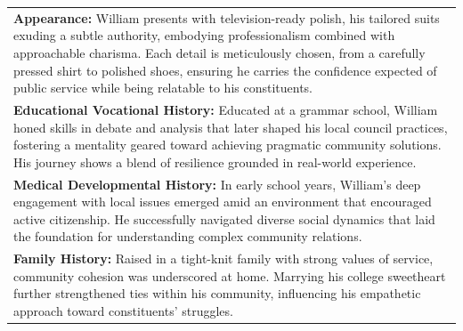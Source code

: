 \documentclass[11pt]{article}
\begin{document}
\begin{table}[ht]
\begin{tabularx}{\textwidth}{X}
\textbf{Appearance:} William presents with television-ready polish, his tailored suits exuding a subtle authority, embodying professionalism combined with approachable charisma. Each detail is meticulously chosen, from a carefully pressed shirt to polished shoes, ensuring he carries the confidence expected of public service while being relatable to his constituents. \\[4pt]

\textbf{Educational Vocational History:} Educated at a grammar school, William honed skills in debate and analysis that later shaped his local council practices, fostering a mentality geared toward achieving pragmatic community solutions. His journey shows a blend of resilience grounded in real-world experience. \\[4pt]

\textbf{Medical Developmental History:} In early school years, William's deep engagement with local issues emerged amid an environment that encouraged active citizenship. He successfully navigated diverse social dynamics that laid the foundation for understanding complex community relations. \\[4pt]

\textbf{Family History:} Raised in a tight-knit family with strong values of service, community cohesion was underscored at home. Marrying his college sweetheart further strengthened ties within his community, influencing his empathetic approach toward constituents' struggles. \\[4pt]

\bottomrule
\end{tabularx}
\end{table}
\end{document}
